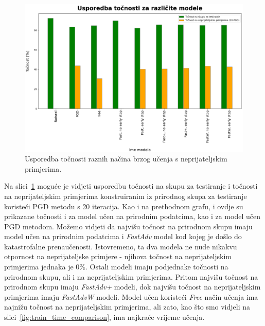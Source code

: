 \documentclass[times, utf8, zavrsni, numeric]{fer}
\begin{document}
\begin{figure}[htb]
    \centering
    \includegraphics[scale=0.42]{../stats/stats_comparison.png}
    \caption{Usporedba točnosti raznih načina brzog učenja s neprijateljskim primjerima.}
    \label{fig:acc_comparison}
\end{figure}

Na slici~\ref{fig:acc_comparison} moguće je vidjeti usporedbu točnosti na skupu za testiranje i točnosti na neprijateljskim primjerima konstruiranim iz prirodnog skupa za testiranje koristeći PGD metodu s 20 iteracija.
Kao i na prethodnom grafu, i ovdje su prikazane točnosti i za model učen na prirodnim podatcima, kao i za model učen PGD metodom.
Možemo vidjeti da najvišu točnost na prirodnom skupu imaju model učen na prirodnim podatcima i \textit{FastAdv} model kod kojeg je došlo do katastrofalne prenaučenosti.
Istovremeno, ta dva modela ne nude nikakvu otpornost na neprijateljske primjere - njihova točnost na neprijateljskim primjerima jednaka je $0\%$.
Ostali modeli imaju podjednake točnosti na prirodnom skupu, ali i na neprijateljskim primjerima.
Pritom najvišu točnost na prirodnom skupu imaju \textit{FastAdv+} modeli, dok najvišu točnost na neprijateljskim primjerima imaju \textit{FastAdvW} modeli.
Model učen koristeći \textit{Free} način učenja ima najnižu točnost na neprijateljskim primjerima, ali zato, kao što smo vidjeli na slici~\ref{fig:train_time_comparison}, ima najkraće vrijeme učenja.
\end{document}
